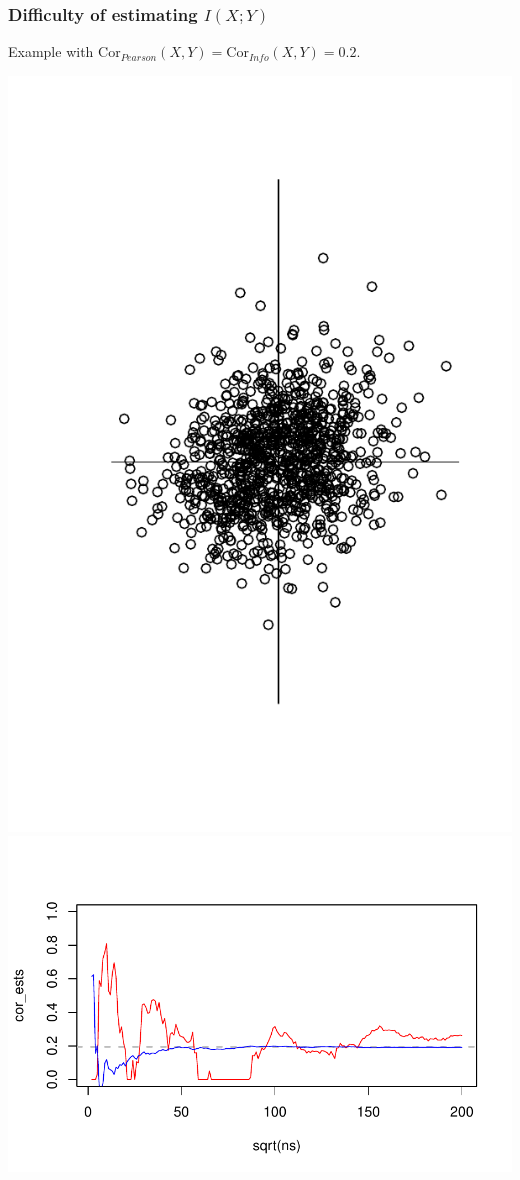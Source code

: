\documentclass{beamer}
\begin{document}
\begin{frame}
\frametitle{Difficulty of estimating $I(X; Y)$}
Example with $\text{Cor}_{Pearson}(X, Y) = \text{Cor}_{Info}(X, Y) = 0.2$.
\begin{center}
\includegraphics[scale = 0.2, clip=true, trim=0 -2in 0 0]{../info_theory_sims/cor_1.pdf}
\includegraphics[scale = 0.5]{../info_theory_sims/cor_info1.pdf}
\end{center}
\end{frame}
\end{document}
